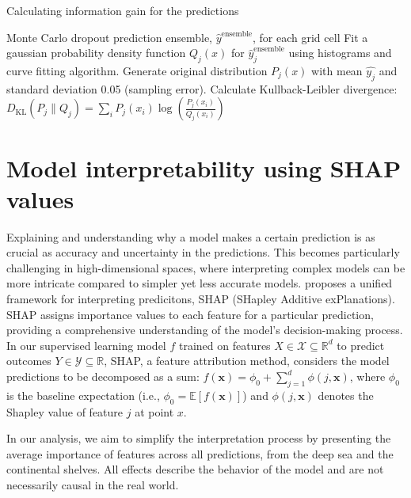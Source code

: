 \documentclass[journal abbreviation, manuscript]{copernicus}
\begin{document}
\begin{algorithm}
\caption{Calculating information gain for the predictions}
\label{alg:informationgain}
\begin{algorithmic}[1]
\REQUIRE Monte Carlo dropout prediction ensemble, $\hat{y}^{\text{ensemble}}$, for each grid cell
    \STATE Fit a gaussian probability density function $Q_j(x)$ for $\hat{y}^{\text{ensemble}}_j$ using histograms and curve fitting algorithm.
    \STATE Generate original distribution $P_j(x)$ with mean $\hat{y_j}$ and standard deviation 0.05 (sampling error).
    \STATE Calculate Kullback-Leibler divergence: \\
    \hspace{3mm} $D_{\text{KL}}(P_j \| Q_j) = \sum_i P_j(x_i) \log\left(\frac{P_j(x_i)}{Q_j(x_i)}\right)$
\ENDFOR
\end{algorithmic}
\end{algorithm}






\newpage
\section{Model interpretability using SHAP values}
Explaining and understanding why a model makes a certain prediction is as crucial as accuracy and uncertainty in the predictions. This becomes particularly challenging in high-dimensional spaces, where interpreting complex models can be more intricate compared to simpler yet less accurate models. \cite{lundberg2017shap} proposes a unified framework for interpreting predicitons, SHAP (SHapley Additive exPlanations). SHAP assigns importance values to each feature for a particular prediction, providing a comprehensive understanding of the model's decision-making process. In our supervised learning model $f$ trained on features $X \in \mathcal{X} \subseteq \mathbb{R}^d$ to predict outcomes $Y \in \mathcal{Y} \subseteq \mathbb{R}$, SHAP, a feature attribution method, considers the model predictions to be decomposed as a sum: $f(\mathbf{x}) = \phi_0 + \sum_{j=1}^{d} \phi(j, \mathbf{x})$, where $\phi_0$ is the baseline expectation (i.e., $\phi_0 = \mathbb{E}[f(\mathbf{x})]$) and $\phi(j, \mathbf{x})$ denotes the Shapley value of feature $j$ at point $x$. 


In our analysis, we aim to simplify the interpretation process by presenting the average importance of features across all predictions, from the deep sea and the continental shelves. All effects describe the behavior of the model and are not necessarily causal in the real world. 
\end{document}
